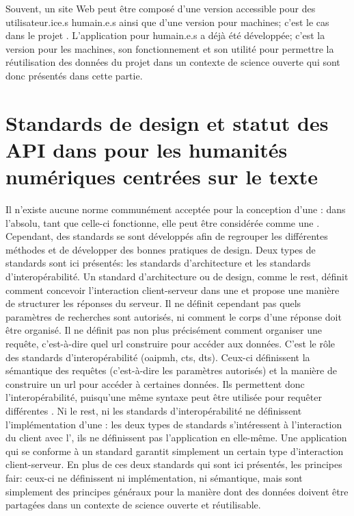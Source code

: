 Souvent, un site Web peut être composé d'une version accessible pour des utilisateur.ice.s humain.e.s ainsi que d'une version pour machines; c'est le cas dans le projet \ktb{}. L'application pour humain.e.s a déjà été développée; c'est la version pour les machines, son fonctionnement et son utilité pour permettre la réutilisation des données du projet dans un contexte de science ouverte qui sont donc présentés dans cette partie.

\chapter{Standards de design et statut des API dans pour les humanités numériques centrées sur le texte}
Il n'existe aucune norme communément acceptée pour la conception d'une \api{}: dans l'absolu, tant que celle-ci fonctionne, elle peut être considérée comme une \api{}. Cependant, des standards se sont développés afin de regrouper les différentes méthodes et de développer des bonnes pratiques de design. Deux types de standards sont ici présentés: les standards d'architecture et les standards d'interopérabilité. Un standard d'architecture ou de design, comme le \gls{rest}, définit comment concevoir l'interaction client-serveur dans une \api{} et propose une manière de structurer les réponses du serveur. Il ne définit cependant pas quels paramètres de recherches sont autorisés, ni comment le corps d'une réponse doit être organisé. Il ne définit pas non plus précisément comment organiser une requête, c'est-à-dire quel \gls{url} construire pour accéder aux données. C'est le rôle des standards d'interopérabilité (\gls{oaipmh}, \gls{cts}, \gls{dts}). Ceux-ci définissent la sémantique des requêtes (c'est-à-dire les paramètres autorisés) et la manière de construire un \gls{url} pour accéder à certaines données. Ils permettent donc l'interopérabilité, puisqu'une même syntaxe peut être utilisée pour requêter différentes \api{}. Ni le \gls{rest}, ni les standards d'interopérabilité ne définissent l'implémentation d'une \api{}: les deux types de standards s'intéressent à l'interaction du client avec l'\api{}, ils ne définissent pas l'application en elle-même. Une application qui se conforme à un standard garantit simplement un certain type d'interaction client-serveur. En plus de ces deux standards qui sont ici présentés, les principes \gls{fair}: ceux-ci ne définissent ni implémentation, ni sémantique, mais sont simplement des principes généraux pour la manière dont des données doivent être partagées dans un contexte de science ouverte et réutilisable.

